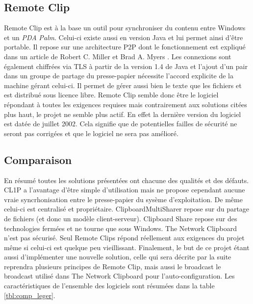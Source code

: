 \subsection{Remote Clip}
Remote Clip \cite{remoteclip} est à la base un outil pour synchroniser
du contenu entre Windows et un \emph{PDA} \emph{Palm}. Celui-ci existe
aussi en version Java et lui permet ainsi d'être portable. Il repose sur une
architecture P2P dont le fonctionnement est expliqué dans un article de Robert
C. Miller et Brad A. Myers \cite{Miller99syncclips}. Les connexions sont
également chiffrées via TLS à partir de la version 1.4 de Java et
l'ajout d'un pair dans un groupe de partage du presse-papier nécessite
l'accord explicite de la machine gérant celui-ci. Il permet de gérer aussi
bien le texte que les fichiers et est distribué sous licence libre.
Remote Clip semble donc être le logiciel répondant à toutes les
exigences requises mais contrairement aux solutions citées plus haut,
le projet ne semble plus actif. En effet la dernière version du logiciel
est datée de juillet 2002. Cela signifie que de potentielles failles
de sécurité ne seront pas corrigées et que le logiciel ne sera pas amélioré.

\subsection{Comparaison}
En résumé toutes les solutions présentées ont chacune des qualités et des
défauts. CL1P a l'avantage d'être simple d'utilisation mais ne propose
cependant aucune vraie syncrhonisation entre le presse-papier du sysème
d'exploitation. De même celui-ci est centralisé et propriétaire.
ClipboardMultiSharer repose sur du partage de fichiers (et donc un
modèle client-serveur). Clipboard Share repose sur des technologies fermées
et ne tourne que sous Windows. The Network Clipboard n'est pas sécurisé.
Seul Remote Clips répond réellement aux exigences du projet même si celui-ci
est quelque peu vieillissant. Finalement, le but de ce projet étant aussi
d'implémenter une nouvelle solution, celle qui sera décrite par la suite
reprendra plusieurs principes de Remote Clip, mais aussi le broadcast le
broadcast utilisé dans The Network Clipboard pour l'auto-configuration.
Les caractéristiques de l'ensemble des logiciels sont résumées dans la
table \ref{tbl:comp_leger}.

